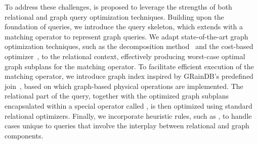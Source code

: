 To address these challenges, \name is proposed to leverage the strengths of both relational and graph query optimization techniques. Building upon the foundation of \spj queries, we introduce the \spjm query skeleton, which extends \spj with a matching operator to represent graph queries. We adapt state-of-the-art graph optimization techniques, such as the decomposition method~\cite{huge} and the cost-based optimizer~\cite{GLogS}, to the relational context, effectively producing worst-case optimal graph subplans for the matching operator. To facilitate efficient execution of the matching operator, we introduce graph index inspired by GRainDB's predefined join~\cite{graindb}, based on which graph-based physical operations are implemented. The relational part of the query, together with the optimized graph subplans encapsulated within a special operator called \scangraphtable, is then optimized using standard relational optimizers. Finally, we incorporate heuristic rules, such as \filterrule, to handle cases unique to \spjm queries that involve the interplay between relational and graph components.


